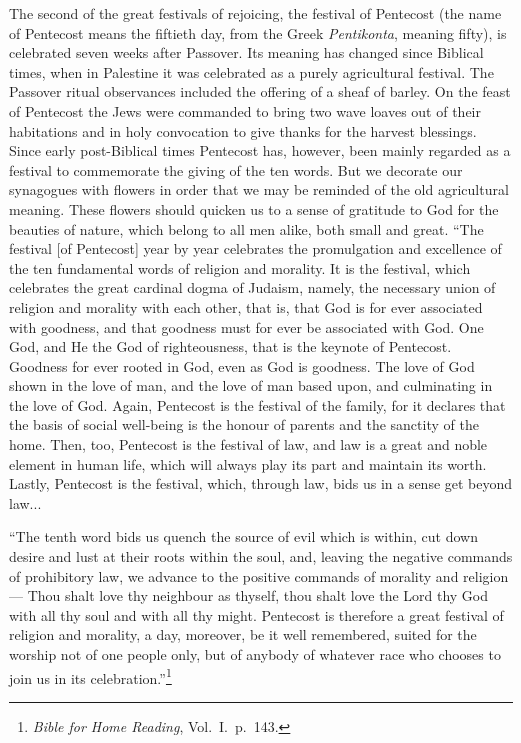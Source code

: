 The second of the great festivals of rejoicing,
the festival of Pentecost (the name
of Pentecost means the fiftieth day, from the
Greek \textsl{Pentikonta}, meaning fifty), is celebrated
seven weeks after Passover. Its meaning
has changed since Biblical times, when in
Palestine it was celebrated as a purely
agricultural festival. The Passover ritual
observances included the offering of a sheaf
of barley. On the feast of Pentecost the Jews
were commanded to bring two wave loaves
out of their habitations and in holy convocation
to give thanks for the harvest blessings.
Since early post-Biblical times Pentecost
has, however, been mainly regarded as a
festival to commemorate the giving of the
ten words. But we decorate our synagogues
with flowers in order that we may be
reminded of the old agricultural meaning.
These flowers should quicken us to a sense
of gratitude to God for the beauties of nature,
which belong to all men alike, both small and
great. “The festival [of Pentecost] year by
year celebrates the promulgation and excellence
of the ten fundamental words of religion
and morality. It is the festival, which celebrates
the great cardinal dogma of Judaism,
namely, the necessary union of religion and
morality with each other, that is, that God
is for ever associated with goodness, and
that goodness must for ever be associated
with God. One God, and He the God
of righteousness, that is the keynote of
Pentecost. Goodness for ever rooted in
God, even as God is goodness. The love
of God shown in the love of man, and the
love of man based upon, and culminating
in the love of God. Again, Pentecost is
the festival of the family, for it declares
that the basis of social well-being is
the honour of parents and the sanctity of
the home. Then, too, Pentecost is the
festival of law, and law is a great and noble
element in human life, which will always play
its part and maintain its worth. Lastly,
Pentecost is the festival, which, through
law, bids us in a sense get beyond law...

“The tenth word bids us quench the source
of evil which is within, cut down desire and
lust at their roots within the soul, and,
leaving the negative commands of prohibitory
law, we advance to the positive
commands of morality and religion — Thou
shalt love thy neighbour as thyself, thou
shalt love the Lord thy God with all thy
soul and with all thy might. Pentecost is
therefore a great festival of religion and
morality, a day, moreover, be it well remembered,
suited for the worship not of one
people only, but of anybody of whatever
race who chooses to join us in its
celebration.”\footnote{\textsl{Bible for Home
Reading}, Vol.\ I.\ p.\ 143.}


